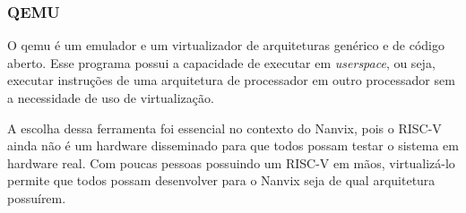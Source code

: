\subsubsection{QEMU}

O qemu \cite{Qemu} é um emulador e um virtualizador de arquiteturas genérico e de código aberto. Esse programa possui a capacidade de 
executar em \emph{userspace}, ou seja, executar instruções de uma arquitetura de processador em outro processador sem a necessidade de uso de virtualização.

A escolha dessa ferramenta foi essencial no contexto do Nanvix, pois o RISC-V ainda não é um hardware disseminado para que todos possam testar o sistema 
em hardware real. Com poucas pessoas possuindo um RISC-V em mãos, virtualizá-lo permite que todos possam desenvolver para o Nanvix seja de qual arquitetura possuírem.
